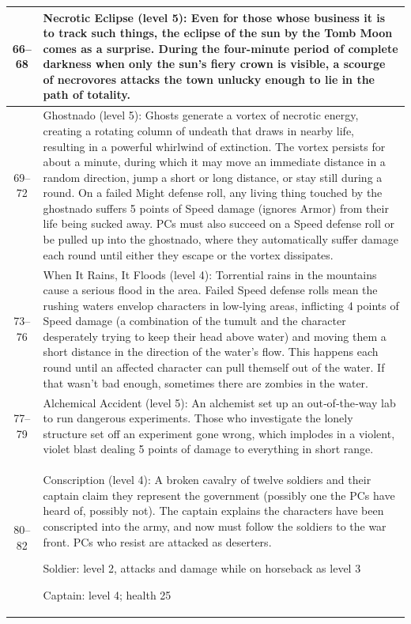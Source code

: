 \begin{longtable}{| c | p{15cm} |}
66–68 &  Necrotic Eclipse (level 5): Even for those whose business it is to track such things, the eclipse of the sun by the Tomb Moon comes as a surprise. During the four-minute period of complete darkness when only the sun’s fiery crown is visible, a scourge of necrovores attacks the town unlucky enough to lie in the path of totality. \\ \hline

69–72 &  Ghostnado (level 5): Ghosts generate a vortex of necrotic energy, creating a rotating column of undeath that draws in nearby life, resulting in a powerful whirlwind of extinction. The vortex persists for about a minute, during which it may move an immediate distance in a random direction, jump a short or long distance, or stay still during a round. On a failed Might defense roll, any living thing touched by the ghostnado suffers 5 points of Speed damage (ignores Armor) from their life being sucked away. PCs must also succeed on a Speed defense roll or be pulled up into the ghostnado, where they automatically suffer damage each round until either they escape or the vortex dissipates.  \\ \hline

73–76 &  When It Rains, It Floods (level 4): Torrential rains in the mountains cause a serious flood in the area. Failed Speed defense rolls mean the rushing waters envelop characters in low‑lying areas, inflicting 4 points of Speed damage (a combination of the tumult and the character desperately trying to keep their head above water) and moving them a short distance in the direction of the water’s flow. This happens each round until an affected character can pull themself out of the water. If that wasn’t bad enough, sometimes there are zombies in the water. \\ \hline

77–79 &  Alchemical Accident (level 5): An alchemist set up an out‑of‑the‑way lab to run dangerous experiments. Those who investigate the lonely structure set off an experiment gone wrong, which implodes in a violent, violet blast dealing 5 points of damage to everything in short range.  \\ \hline

80–82 &  Conscription (level 4): A broken cavalry of twelve soldiers and their captain claim they represent the government (possibly one the PCs have heard of, possibly not). The captain explains the characters have been conscripted into the army, and now must follow the soldiers to the war front. PCs who resist are attacked as deserters. \par
Soldier: level 2, attacks and damage while on horseback as level 3 \par
Captain: level 4; health 25 \\ \hline


\end{longtable}
